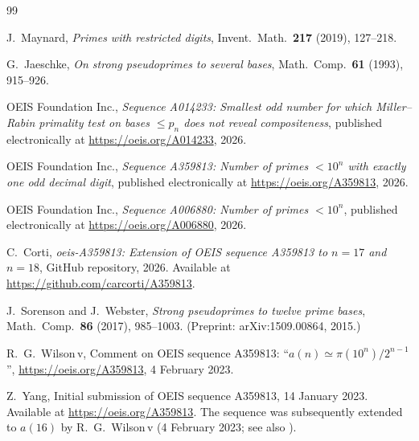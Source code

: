 \documentclass[11pt,a4paper]{article}
\theoremstyle{definition}
\begin{document}
\begin{thebibliography}{99}

J.\ Maynard,
\emph{Primes with restricted digits},
Invent.\ Math.\ \textbf{217} (2019), 127--218.

G.\ Jaeschke,
\emph{On strong pseudoprimes to several bases},
Math.\ Comp.\ \textbf{61} (1993), 915--926.

OEIS Foundation Inc.,
\emph{Sequence A014233: Smallest odd number for which Miller--Rabin
primality test on bases $\leq p_n$ does not reveal compositeness},
published electronically at \url{https://oeis.org/A014233}, 2026.

OEIS Foundation Inc.,
\emph{Sequence A359813: Number of primes $< 10^n$ with exactly one odd
decimal digit},
published electronically at \url{https://oeis.org/A359813}, 2026.

OEIS Foundation Inc.,
\emph{Sequence A006880: Number of primes $< 10^n$},
published electronically at \url{https://oeis.org/A006880}, 2026.

C.\ Corti,
\emph{oeis-A359813: Extension of OEIS sequence A359813 to $n = 17$ and
$n = 18$},
GitHub repository, 2026.
Available at \url{https://github.com/carcorti/A359813}.

J.\ Sorenson and J.\ Webster,
\emph{Strong pseudoprimes to twelve prime bases},
Math.\ Comp.\ \textbf{86} (2017), 985--1003.
(Preprint: arXiv:1509.00864, 2015.)

R.\ G.\ Wilson\,v,
Comment on OEIS sequence A359813: ``$a(n) \simeq \pi(10^n)/2^{n-1}$'',
\url{https://oeis.org/A359813}, 4 February 2023.

Z.\ Yang,
Initial submission of OEIS sequence A359813,
14 January 2023. Available at \url{https://oeis.org/A359813}.
The sequence was subsequently extended to $a(16)$ by R.\ G.\ Wilson\,v
(4 February 2023; see also \cite{Wilson-comment}).

\end{thebibliography}
\end{document}
